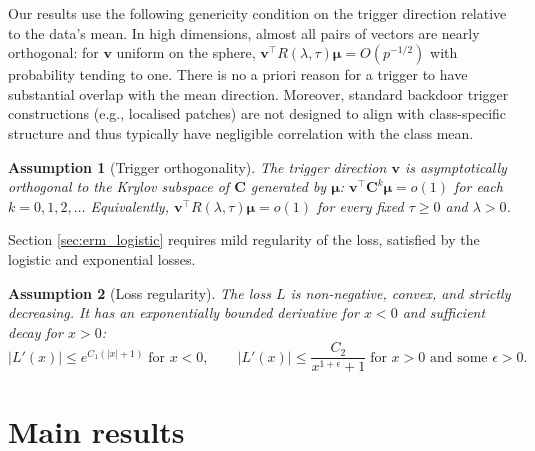 \documentclass[11pt]{article}
\newcommand{\I}{\mathbf{I}}
\newcommand{\C}{\mathbf{C}}
\newcommand{\bv}{\mathbf{v}}
\newcommand{\bmu}{\boldsymbol{\mu}}
\newtheorem{assumption}{Assumption}
\begin{document}
Our results use the following genericity condition on the trigger direction relative to the data's mean. In high dimensions, almost all pairs of vectors are nearly orthogonal: for $\bv$ uniform on the sphere, $\bv^\top R(\lambda, \tau)\bmu = O(p^{-1/2})$ with probability tending to one. There is no a priori reason for a trigger to have substantial overlap with the mean direction. 
Moreover, standard backdoor trigger constructions (e.g., localised patches) are not designed to align with class-specific structure and thus typically have negligible correlation with the class mean.
\begin{assumption}[Trigger orthogonality]
\label{ass:orthogonality}
The trigger direction $\bv$ is asymptotically orthogonal to the
Krylov subspace of $\C$ generated by $\bmu$:
$\bv^\top \C^k \bmu = o(1)$ for each $k = 0, 1, 2, \ldots$
Equivalently, $\bv^\top
R(\lambda, \tau)\bmu = o(1)$
for every fixed $\tau \geq 0$ and $\lambda>0$.
\end{assumption}


Section \ref{sec:erm_logistic} requires mild regularity of the loss, satisfied by the logistic and exponential losses. 

\begin{assumption}[Loss regularity]
\label{ass:loss}
The loss $L$ is non-negative, convex, and strictly decreasing.
It has an exponentially bounded derivative for $x < 0$ and
sufficient decay for $x > 0$:
\[
|L'(x)| \leq e^{C_1(|x|+1)} \;\text{for } x < 0,
\qquad
|L'(x)| \leq \frac{C_2}{x^{1+\epsilon}+1} \;\text{for } x > 0
\text{ and some } \epsilon > 0.
\]
\end{assumption} 


\section{Main results}
\label{sec:main_results}
\end{document}
